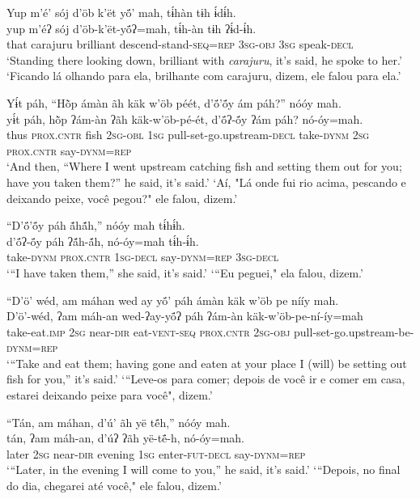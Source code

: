 \documentclass[output=paper,
modfonts,nonflat
]{langsci/langscibook}
\begin{document}
\ea  Yup m’é’ sój d’öb k’ët yö́’ mah, tɨ́hàn tɨh ɨ́dɨ́h.\\ 
\gll yup m’éʔ sój d’öb-k’ët-yö́ʔ=mah, tɨ́h-àn tɨh ʔɨ́d-ɨ́h.\\
     that carajuru brilliant descend-stand\textsc{-seq=rep} \textsc{3sg-obj} \textsc{3sg} speak\textsc{-decl}\\
\glt ‘Standing there looking down, brilliant with \textit{carajuru}, it’s said, he spoke to her.'
\glt ‘Ficando lá olhando para ela, brilhante com carajuru, dizem, ele falou para ela.'
\z 

\ea  Yɨ́t páh, “Hõ̀p ámàn ãh käk w’öb péét, d’ö́’ö́y ám páh?” nóóy mah.\\ 
\gll yɨ́t páh, hõ̀p ʔám-àn ʔãh käk-w’öb-pé-ét, d’ö́ʔ-ö́y ʔám páh? nó-óy=mah.\\
     thus \textsc{prox.cntr} fish \textsc{2sg-obl} \textsc{1sg} pull-set-go.upstream\textsc{-decl} take\textsc{-dynm} \textsc{2sg} \textsc{prox.cntr} say\textsc{-dynm=rep}\\
\glt ‘And then, “Where I went upstream catching fish and setting them out for you; have you taken them?” he said, it’s said.'
\glt ‘Aí, "Lá onde fui rio acima, pescando e deixando peixe, você pegou?" ele falou, dizem.'
\z 

\ea  “D’ö́’ö́y páh ã́hã́h,” nóóy mah tɨ́hɨ́h.\\ 
\gll d’ö́ʔ-ö́y páh ʔã́h-ã́h, nó-óy=mah tɨ́h-ɨ́h.\\
     take\textsc{-dynm} \textsc{prox.cntr} \textsc{1sg-decl} say\textsc{-dynm=rep} \textsc{3sg-decl}\\
\glt ‘“I have taken them,” she said, it’s said.'
\glt ‘“Eu peguei," ela falou, dizem.'
\z 

\ea  “D’ö’ wéd, am máhan wed ay yö́’ páh ámàn käk w’öb pe nííy mah.\\ 
\gll	D’ö’-wéd, ʔam máh-an wed-ʔay-yö́ʔ páh ʔám-àn käk-w’öb-pe-ní-íy=mah\\
	take-eat.\textsc{imp} \textsc{2sg} near\textsc{-dir} eat-\textsc{vent-seq} \textsc{prox.cntr} \textsc{2sg-obj} pull-set-go.upstream-be-\textsc{dynm=rep}\\
\glt ‘“Take and eat them; having gone and eaten at your place I (will) be setting out fish for you,” it’s said.' 
\glt ‘“Leve-os para comer; depois de você ir e comer em casa, estarei deixando peixe para você", dizem.'
\z 

\newpage
\ea  “Tán, am máhan, d’ú’ ãh yë të́h,” nóóy mah.\\ 
\gll tán, ʔam máh-an, d’úʔ ʔãh yë-të́-h, nó-óy=mah.\\
     later \textsc{2sg} near\textsc{-dir} evening \textsc{1sg} enter\textsc{-fut-decl} say\textsc{-dynm=rep}\\
\glt ‘“Later, in the evening I will come to you,” he said, it’s said.'
\glt ‘“Depois, no final do dia, chegarei até você," ele falou, dizem.'
\z 
\end{document}
